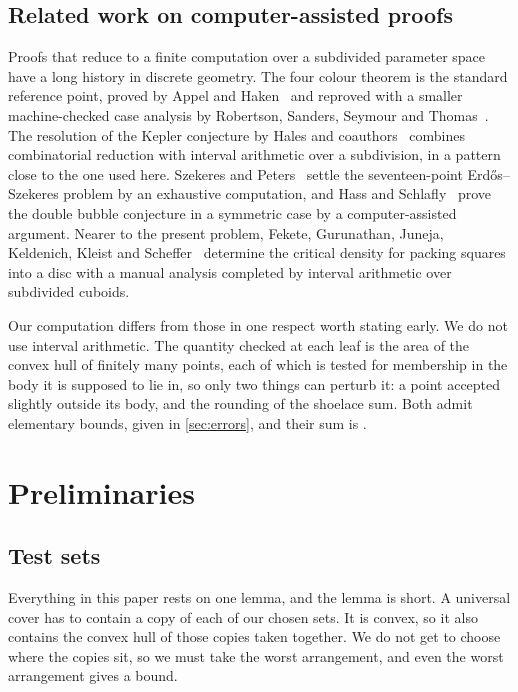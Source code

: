 \documentclass[a4paper,UKenglish,cleveref,autoref,thm-restate,numberwithinsect]{lipics-v2021}
\begin{document}
\subsection{Related work on computer-assisted proofs}
\label{sec:relatedcomp}

Proofs that reduce to a finite computation over a subdivided parameter space have
a long history in discrete geometry. The four colour theorem is the standard
reference point, proved by Appel and Haken~\cite{AppelHaken1977a,AppelHaken1977b}
and reproved with a smaller machine-checked case analysis by Robertson, Sanders,
Seymour and Thomas~\cite{RobertsonEtAl1997}. The resolution of the Kepler
conjecture by Hales and coauthors~\cite{HalesEtAl2017} combines combinatorial
reduction with interval arithmetic over a subdivision, in a pattern close to the
one used here. Szekeres and Peters~\cite{SzekeresPeters2006} settle the
seventeen-point Erd\H{o}s--Szekeres problem by an exhaustive computation, and Hass
and Schlafly~\cite{HassSchlafly2000} prove the double bubble conjecture in a
symmetric case by a computer-assisted argument. Nearer to the present problem,
Fekete, Gurunathan, Juneja, Keldenich, Kleist and
Scheffer~\cite{FeketeEtAl2021} determine the critical density for packing squares
into a disc with a manual analysis completed by interval arithmetic over
subdivided cuboids.

Our computation differs from those in one respect worth stating early. We do not
use interval arithmetic. The quantity checked at each leaf is the area of the
convex hull of finitely many points, each of which is tested for membership in
the body it is supposed to lie in, so only two things can perturb it: a point
accepted slightly outside its body, and the rounding of the shoelace sum. Both
admit elementary bounds, given in \cref{sec:errors}, and their sum is \Eta.

\section{Preliminaries}
\label{sec:prelim}

\subsection{Test sets}

Everything in this paper rests on one lemma, and the lemma is short. A universal
cover has to contain a copy of each of our chosen sets. It is convex, so it also
contains the convex hull of those copies taken together. We do not get to choose
where the copies sit, so we must take the worst arrangement, and even the worst
arrangement gives a bound.
\end{document}
